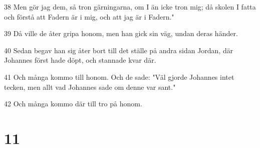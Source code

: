 \par 38 Men gör jag dem, så tron gärningarna, om I än icke tron mig; då skolen I fatta och förstå att Fadern är i mig, och att jag är i Fadern."
\par 39 Då ville de åter gripa honom, men han gick sin väg, undan deras händer.
\par 40 Sedan begav han sig åter bort till det ställe på andra sidan Jordan, där Johannes först hade döpt, och stannade kvar där.
\par 41 Och många kommo till honom. Och de sade: "Väl gjorde Johannes intet tecken, men allt vad Johannes sade om denne var sant."
\par 42 Och många kommo där till tro på honom.

\chapter{11}

